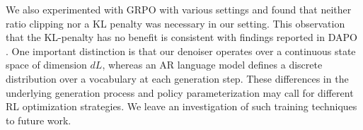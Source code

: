 We also experimented with GRPO \citep{shao2024deepseekmath} with various settings and found that neither ratio clipping nor a KL penalty was necessary in our setting.
This observation that the KL-penalty has no benefit is consistent with findings reported in DAPO \citep{yu2025dapo}. One important distinction is that our denoiser operates over a continuous state space of dimension $dL$, whereas an AR language model defines a discrete distribution over a vocabulary at each generation step. These differences in the underlying generation process and policy parameterization may call for different RL optimization strategies. We leave an  investigation of such training techniques to future work.


%
%
%
